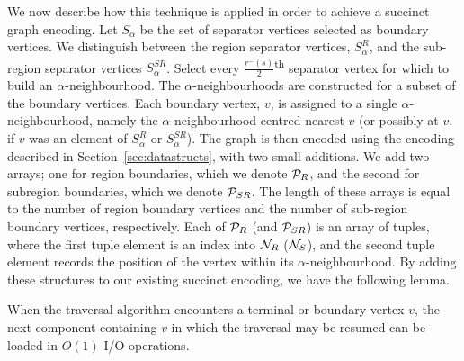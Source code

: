 We now describe how this technique is applied in order to achieve a succinct graph
encoding. 
Let $S_\alpha$ be the set of separator vertices selected as boundary
vertices.
We distinguish between the region separator vertices, 
$S^{R}_\alpha$, and the sub-region separator vertices $S^{SR}_\alpha$.
Select every $\frac{r^{-}(s)}{2}$\textsuperscript{th} separator vertex 
for which to build an $\alpha$-neighbourhood. 
The $\alpha$-neighbourhoods are constructed for a subset of 
the boundary vertices.
Each boundary vertex, $v$, is assigned to a single $\alpha$-neighbourhood, namely
the $\alpha$-neighbourhood centred nearest $v$ (or possibly at
$v$, if $v$ was an element of $S^{R}_\alpha$ or $S^{SR}_\alpha$). 
The graph is then encoded using the encoding described in 
Section~\ref{sec:datastructs}, with two small additions.
We add two arrays; one for region boundaries, which we denote 
$\mathcal{P}_R$, and the second for subregion boundaries,
which we denote $\mathcal{P}_{SR}$.
The length of these arrays is equal to the number of region boundary 
vertices and the number of sub-region boundary vertices, respectively.
Each of $\mathcal{P}_R$ (and $\mathcal{P}_{SR}$) is an array of tuples, where
the first tuple element is an index into $\mathcal{N}_R$ ($\mathcal{N}_S$), 
and the second tuple element records the position of the vertex within
its $\alpha$-neighbourhood. 
By adding these structures to our existing succinct encoding, we have the
 following lemma.

\begin{lemma}
\label{lem:ptable_ios}
When the traversal algorithm encounters a terminal or boundary
vertex $v$, the next component containing $v$ in which the traversal
may be resumed can be loaded in $O(1)$ I/O operations.
\end{lemma}

